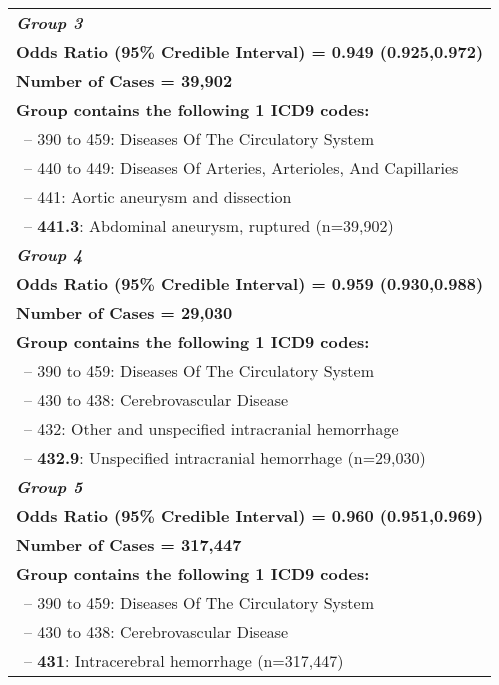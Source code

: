\begin{longtable}{p{\textwidth}}
 \textbf{\emph{Group 3}}\\ 
\textbf{Odds Ratio (95\% Credible Interval) = 0.949 (0.925,0.972)} \\ \textbf{Number of Cases = 39,902} \\ \textbf{Group contains the following 1 ICD9 codes:} \\ \-\ \hspace{ 0pt}\footnotesize{-- 390 to 459: Diseases Of The Circulatory System} \\ \-\ \hspace{10pt}\footnotesize{-- 440 to 449: Diseases Of Arteries, Arterioles, And Capillaries} \\ \-\ \hspace{20pt}\footnotesize{-- 441: Aortic aneurysm and dissection} \\ \-\ \hspace{30pt}\footnotesize{-- {\color{ForestGreen} \textbf{441.3}}: Abdominal aneurysm, ruptured (n=39,902)} \\  
 \hline 
 
 \textbf{\emph{Group 4}}\\ 
\textbf{Odds Ratio (95\% Credible Interval) = 0.959 (0.930,0.988)} \\ \textbf{Number of Cases = 29,030} \\ \textbf{Group contains the following 1 ICD9 codes:} \\ \-\ \hspace{ 0pt}\footnotesize{-- 390 to 459: Diseases Of The Circulatory System} \\ \-\ \hspace{10pt}\footnotesize{-- 430 to 438: Cerebrovascular Disease} \\ \-\ \hspace{20pt}\footnotesize{-- 432: Other and unspecified intracranial hemorrhage} \\ \-\ \hspace{30pt}\footnotesize{-- {\color{ForestGreen} \textbf{432.9}}: Unspecified intracranial hemorrhage (n=29,030)} \\  
 \hline 
 
 \textbf{\emph{Group 5}}\\ 
\textbf{Odds Ratio (95\% Credible Interval) = 0.960 (0.951,0.969)} \\ \textbf{Number of Cases = 317,447} \\ \textbf{Group contains the following 1 ICD9 codes:} \\ \-\ \hspace{ 0pt}\footnotesize{-- 390 to 459: Diseases Of The Circulatory System} \\ \-\ \hspace{10pt}\footnotesize{-- 430 to 438: Cerebrovascular Disease} \\ \-\ \hspace{20pt}\footnotesize{-- {\color{ForestGreen} \textbf{431}}: Intracerebral hemorrhage (n=317,447)} \\  
 \hline 
 

\end{longtable}
